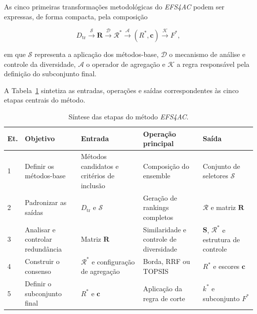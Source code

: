 As cinco primeiras transformações metodológicas do \textit{EFS4AC} podem ser
expressas, de forma compacta, pela composição

\begin{equation}
    D_{\mathrm{tr}}
    \xrightarrow{\mathcal{S}}
    \mathbf{R}
    \xrightarrow{\mathcal{D}}
    \mathcal{R}^{*}
    \xrightarrow{\mathcal{A}}
    \left(R^{*},\mathbf{c}\right)
    \xrightarrow{\mathcal{K}}
    F^{*},
    \label{eq:fluxo-geral-ac-efs}
\end{equation}

em que $\mathcal{S}$ representa a aplicação dos métodos-base,
$\mathcal{D}$ o mecanismo de análise e controle da diversidade,
$\mathcal{A}$ o operador de agregação e $\mathcal{K}$ a regra responsável
pela definição do subconjunto final.

A Tabela~\ref{tab:entradas-saidas-ac-efs} sintetiza as entradas, operações e
saídas correspondentes às cinco etapas centrais do método.

\begin{table}[ht]
    \centering
    \small
    \caption{Síntese das etapas do método \textit{EFS4AC}.}
    \label{tab:entradas-saidas-ac-efs}
    \renewcommand{\arraystretch}{1.20}
    \setlength{\tabcolsep}{4pt}

    \begin{tabular}{
        p{0.7cm}
        p{3.0cm}
        p{3.0cm}
        p{3.3cm}
        p{3.2cm}
    }
        \hline
        \textbf{Et.}
        & \textbf{Objetivo}
        & \textbf{Entrada}
        & \textbf{Operação principal}
        & \textbf{Saída} \\
        \hline

        1
        & Definir os métodos-base
        & Métodos candidatos e critérios de inclusão
        & Composição do ensemble
        & Conjunto de seletores $\mathcal{S}$ \\

        2
        & Padronizar as saídas
        & $D_{\mathrm{tr}}$ e $\mathcal{S}$
        & Geração de rankings completos
        & $\mathcal{R}$ e matriz $\mathbf{R}$ \\

        3
        & Analisar e controlar redundância
        & Matriz $\mathbf{R}$
        & Similaridade e controle de diversidade
        & $\mathbf{S}$, $\mathcal{R}^{*}$ e estrutura de controle \\

        4
        & Construir o consenso
        & $\mathcal{R}^{*}$ e configuração de agregação
        & Borda, RRF ou TOPSIS
        & $R^{*}$ e escores $\mathbf{c}$ \\

        5
        & Definir o subconjunto final
        & $R^{*}$ e $\mathbf{c}$
        & Aplicação da regra de corte
        & $k^{*}$ e subconjunto $F^{*}$ \\

        \hline
    \end{tabular}
\end{table}

